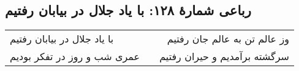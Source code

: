\begin{center}
\section*{رباعی شمارهٔ ۱۲۸: با یاد جلال در بیابان رفتیم}
\label{sec:128}
\begin{longtable}{l p{0.5cm} r}
با یاد جلال در بیابان رفتیم
&&
وز عالم تن به عالم جان رفتیم
\\
عمری شب و روز در تفکر بودیم
&&
سرگشته برآمدیم و حیران رفتیم
\\
\end{longtable}
\end{center}
